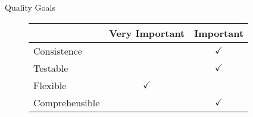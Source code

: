 \begin{frame}{Quality Goals}
\begin{figure}[]
		\begin{tabular}{| l | m{} | m{}|} \hline
 & Very Important&Important \\ \hline
Consistence  				&& \multicolumn{1}{c|}{$\checkmark$} 		\\ \hline
Testable  					&& \multicolumn{1}{c|}{$\checkmark$} 		\\ \hline
Flexible  					& \multicolumn{1}{c|}{$\checkmark$}& 		\\ \hline
Comprehensible  		&& \multicolumn{1}{c|}{$\checkmark$} 		\\ \hline
		\end{tabular}
	\label{fig:prioritizedCrit}
\end{figure}

\end{frame}